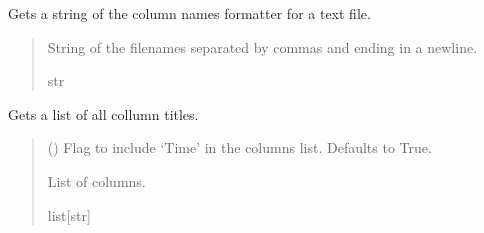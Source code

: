\documentclass[letterpaper,10pt,english]{sphinxmanual}
\begin{document}
\begin{fulllineitems}
\begin{fulllineitems}
\end{fulllineitems}


\begin{fulllineitems}
\label{\detokenize{Morelia.Stream.PodHandler:Morelia.Stream.PodHandler.Handle8206HR.Drain8206HR.GetDeviceColNames}}
\pysigstartsignatures
{}
\pysigstopsignatures
\sphinxAtStartPar
Gets a string of the column names formatter for a text file.
\begin{quote}\begin{description}
\sphinxAtStartPar
String of the filenames separated by commas and ending in a newline.

\sphinxAtStartPar
str

\end{description}\end{quote}

\end{fulllineitems}


\begin{fulllineitems}
\label{\detokenize{Morelia.Stream.PodHandler:Morelia.Stream.PodHandler.Handle8206HR.Drain8206HR.GetDeviceColNamesList}}
\pysigstartsignatures
{}
\pysigstopsignatures
\sphinxAtStartPar
Gets a list of all collumn titles.
\begin{quote}\begin{description}
\sphinxAtStartPar
{} (\sphinxstyleliteralemphasis{\sphinxupquote{, }}) \textendash{} Flag to include ‘Time’ in the columns list.                 Defaults to True.

\sphinxAtStartPar
List of columns.

\sphinxAtStartPar
list{[}str{]}

\end{description}\end{quote}

\end{fulllineitems}


\end{fulllineitems}
\end{document}
